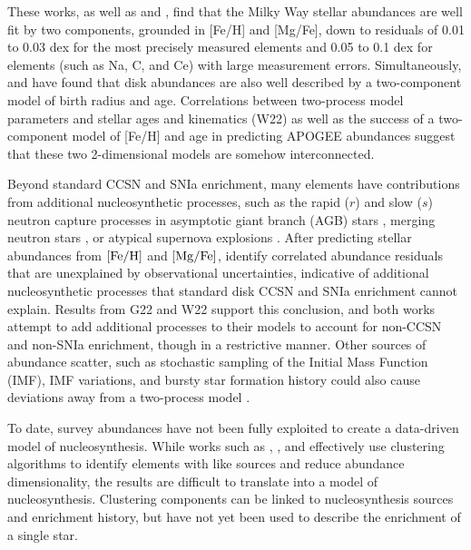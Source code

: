 \documentclass[modern, linenumbers]{aastex631}
\newcommand{\mgfe}[0]{[{\rm Mg/Fe}]}
\newcommand{\feh}[0]{[{\rm Fe/H}]}
\begin{document}
These works, as well as \citet{ting2022} and \citet{ratcliffe2023}, find that the Milky Way stellar abundances are well fit by two components, grounded in [Fe/H] and [Mg/Fe], down to residuals of 0.01 to 0.03 dex for the most precisely measured elements and 0.05 to 0.1 dex for elements (such as Na, C, and Ce) with large measurement errors. Simultaneously, \citet{frankel2018} and \citet{ness2022} have found that disk abundances are also well described by a two-component model of birth radius and age. Correlations between two-process model parameters and stellar ages and kinematics (W22) as well as the success of a two-component model of [Fe/H] and age in predicting APOGEE abundances \citep{ness2019} suggest that these two 2-dimensional models are somehow interconnected. 

Beyond standard CCSN and SNIa enrichment, many elements have contributions from additional nucleosynthetic processes, such as the rapid ($r$) and slow ($s$) neutron capture processes \citep[e.g.,][]{arlandini1999, bisterzo2014} in asymptotic giant branch (AGB) stars \citep[e.g.,][]{simmerer2004, karakas2016}, merging neutron stars \citep[e.g.,][]{kilpatrick2017}, or atypical supernova explosions \citep[e.g.,][]{nomoto2013}. After predicting stellar abundances from $\feh$ and $\mgfe$, \citet{ting2022} identify correlated abundance residuals that are unexplained by observational uncertainties, indicative of additional nucleosynthetic processes that standard disk CCSN and SNIa enrichment cannot explain. Results from G22 and W22 support this conclusion, and both works attempt to add additional processes to their models to account for non-CCSN and non-SNIa enrichment, though in a restrictive manner. Other sources of abundance scatter, such as stochastic sampling of the Initial Mass Function (IMF), IMF variations, and bursty star formation history could also cause deviations away from a two-process model \citep{belokurov2018, griffith2023}.

To date, survey abundances have not been fully exploited to create a data-driven model of nucleosynthesis. While works such as \citet{ting2012}, \citet{casey2019}, and \citet{ratcliffe2020} effectively use clustering algorithms to identify elements with like sources and reduce abundance dimensionality, the results are difficult to translate into a model of nucleosynthesis. Clustering components can be linked to nucleosynthesis sources and enrichment history, but have not yet been used to describe the enrichment of a single star.
\end{document}
